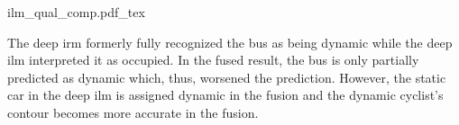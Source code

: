 \begin{center}
		{ilm_qual_comp.pdf_tex}
\end{center}
The deep \gls{irm} formerly fully recognized the bus as being dynamic while the deep \gls{ilm} interpreted it as occupied. In the fused result, the bus is only partially predicted as dynamic which, thus, worsened the prediction. However, the static car in the deep \gls{ilm} is assigned dynamic in the fusion and the dynamic cyclist's contour becomes more accurate in the fusion.
%
